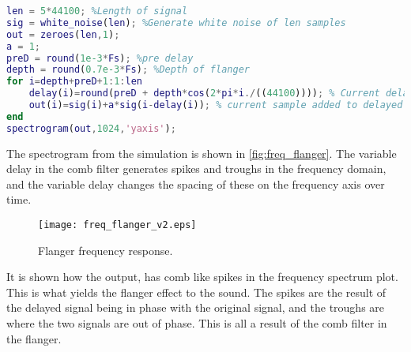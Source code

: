 \begin{lstlisting}[caption={Simulation of flanger in MATLAB.},language=MATLAB,label={code:simulation_matlab_flanger}]
len = 5*44100; %Length of signal
sig = white_noise(len); %Generate white noise of len samples
out = zeroes(len,1);
a = 1;
preD = round(1e-3*Fs); %pre delay 
depth = round(0.7e-3*Fs); %Depth of flanger 
for i=depth+preD+1:1:len
    delay(i)=round(preD + depth*cos(2*pi*i./((44100)))); % Current delay is calculated
    out(i)=sig(i)+a*sig(i-delay(i)); % current sample added to delayed sample
end
spectrogram(out,1024,'yaxis');
\end{lstlisting}

The spectrogram from the simulation is shown in \autoref{fig:freq_flanger}. The variable delay in the comb filter generates spikes and troughs in the frequency domain, and the variable delay changes the spacing of these on the frequency axis over time. 



\begin{figure}[htbp]
	\centering
	\texttt{[image: freq\_flanger\_v2.eps]}
	\caption{Flanger frequency response.}
	\label{fig:freq_flanger}
\end{figure}

It is shown how the output, has comb like spikes in the frequency spectrum plot. This is what yields the flanger effect to the sound. The spikes are the result of the delayed signal being in phase with the original signal, and the troughs are where the two signals are out of phase. This is all a result of the comb filter in the flanger. 
